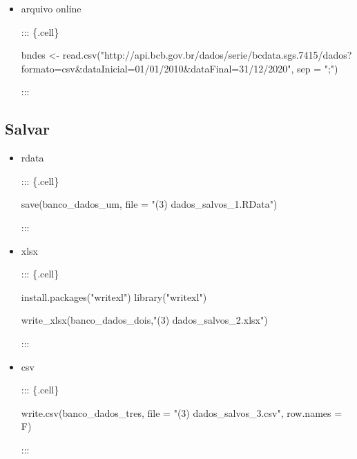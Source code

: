 \documentclass[
  letterpaper,
  DIV=11,
  numbers=noendperiod]{scrreprt}
\newenvironment{Shaded}{\begin{snugshade}}{\end{snugshade}}
\newcommand{\AttributeTok}[1]{\textcolor[rgb]{0.40,0.45,0.13}{#1}}
\newcommand{\FunctionTok}[1]{\textcolor[rgb]{0.28,0.35,0.67}{#1}}
\newcommand{\NormalTok}[1]{\textcolor[rgb]{0.00,0.23,0.31}{#1}}
\newcommand{\OtherTok}[1]{\textcolor[rgb]{0.00,0.23,0.31}{#1}}
\newcommand{\StringTok}[1]{\textcolor[rgb]{0.13,0.47,0.30}{#1}}
\begin{document}
\begin{itemize}
\begin{itemize}
    :::
  \item
    arquivo online

    ::: \{.cell\}

\begin{Shaded}
\begin{Highlighting}[]
\NormalTok{bndes }\OtherTok{\textless{}{-}} \FunctionTok{read.csv}\NormalTok{(}\StringTok{"http://api.bcb.gov.br/dados/serie/bcdata.sgs.7415/dados?formato=csv\&dataInicial=01/01/2010\&dataFinal=31/12/2020"}\NormalTok{,}
        \AttributeTok{sep =} \StringTok{";"}\NormalTok{)}
\end{Highlighting}
\end{Shaded}

    :::
  \end{itemize}
\end{itemize}

\hypertarget{salvar}{%
\subsection{Salvar}\label{salvar}}

\begin{itemize}
\item
  rdata

  ::: \{.cell\}

\begin{Shaded}
\begin{Highlighting}[]
\FunctionTok{save}\NormalTok{(banco\_dados\_um, }\AttributeTok{file =} \StringTok{"(3) dados\_salvos\_1.RData"}\NormalTok{)}
\end{Highlighting}
\end{Shaded}

  :::
\item
  xlsx

  ::: \{.cell\}

\begin{Shaded}
\begin{Highlighting}[]
\FunctionTok{install.packages}\NormalTok{(}\StringTok{"writexl"}\NormalTok{)}
\FunctionTok{library}\NormalTok{(}\StringTok{"writexl"}\NormalTok{)}

\FunctionTok{write\_xlsx}\NormalTok{(banco\_dados\_dois,}\StringTok{"(3) dados\_salvos\_2.xlsx"}\NormalTok{)}
\end{Highlighting}
\end{Shaded}

  :::
\item
  csv

  ::: \{.cell\}

\begin{Shaded}
\begin{Highlighting}[]
\FunctionTok{write.csv}\NormalTok{(banco\_dados\_tres, }\AttributeTok{file =} \StringTok{"(3) dados\_salvos\_3.csv"}\NormalTok{, }\AttributeTok{row.names =}\NormalTok{ F)}
\end{Highlighting}
\end{Shaded}

  :::
\end{itemize}
\end{document}
